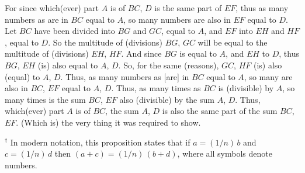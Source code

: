 \begin{Parallel}{}{}
{For since which(ever) part $A$ is of $BC$, $D$ is the same part of $EF$, thus as many
numbers as are in $BC$ equal to $A$, so many numbers are also in 
$EF$ equal to $D$. Let $BC$ have been divided into $BG$ and $GC$, equal to $A$, and
$EF$ into $EH$ and $HF$, equal to $D$. So the multitude of (divisions) $BG$,
$GC$ will be equal to the multitude of (divisions) $EH$, $HF$. And
since $BG$ is equal to $A$, and $EH$ to $D$, thus $BG$, $EH$ (is) also equal to $A$, $D$.
So, for the same (reasons), $GC$, $HF$ (is) also (equal) to $A$, $D$. Thus,
as many numbers as [are] in $BC$ equal to $A$, so many are
also in $BC$, $EF$ equal to $A$, $D$. Thus, as many times as $BC$ is (divisible)
by $A$, so many times is the sum $BC$, $EF$ also (divisible)  by the sum $A$, $D$.
Thus, which(ever) part $A$ is of $BC$, the sum $A$, $D$ is also the same
part of the sum $BC$, $EF$. (Which is) the very thing it was required to show.}
\end{Parallel}
{\footnotesize\noindent$^\dag$ In modern notation, this
proposition states that if $a = (1/n)\,b$ and $c = (1/n)\,d$ then $(a+c) = (1/n)\,(b+d)$,
where all symbols denote numbers.}

